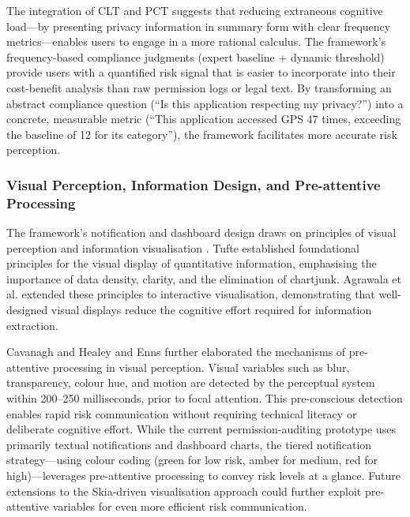 The integration of CLT and PCT suggests that reducing extraneous cognitive load—by presenting privacy information in summary form with clear frequency metrics—enables users to engage in a more rational calculus. The framework's frequency-based compliance judgments (expert baseline + dynamic threshold) provide users with a quantified risk signal that is easier to incorporate into their cost-benefit analysis than raw permission logs or legal text. By transforming an abstract compliance question (``Is this application respecting my privacy?'') into a concrete, measurable metric (``This application accessed GPS 47 times, exceeding the baseline of 12 for its category''), the framework facilitates more accurate risk perception.

\subsubsection{Visual Perception, Information Design, and Pre-attentive Processing}
The framework's notification and dashboard design draws on principles of visual perception and information visualisation \cite{28, 29}. Tufte \cite{28} established foundational principles for the visual display of quantitative information, emphasising the importance of data density, clarity, and the elimination of chartjunk. Agrawala et al. \cite{29} extended these principles to interactive visualisation, demonstrating that well-designed visual displays reduce the cognitive effort required for information extraction.

Cavanagh \cite{30} and Healey and Enns \cite{31} further elaborated the mechanisms of pre-attentive processing in visual perception. Visual variables such as blur, transparency, colour hue, and motion are detected by the perceptual system within 200–250 milliseconds, prior to focal attention. This pre-conscious detection enables rapid risk communication without requiring technical literacy or deliberate cognitive effort. While the current permission-auditing prototype uses primarily textual notifications and dashboard charts, the tiered notification strategy—using colour coding (green for low risk, amber for medium, red for high)—leverages pre-attentive processing to convey risk levels at a glance. Future extensions to the Skia-driven visualisation approach could further exploit pre-attentive variables for even more efficient risk communication.

